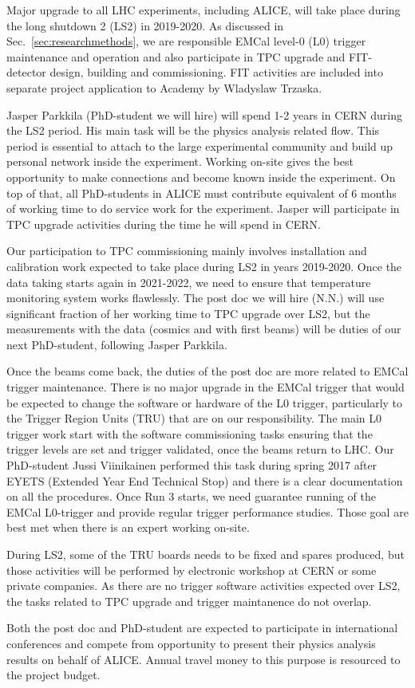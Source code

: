Major upgrade to all LHC experiments, including ALICE, will take place during the long shutdown 2 (LS2) in 2019-2020. As discussed in Sec.~\ref{sec:researchmethods}, we are responsible EMCal level-0 (L0) trigger maintenance and operation and also participate in TPC upgrade and FIT-detector design, building and commissioning. FIT activities are included into separate project application to Academy by Wladyslaw Trzaska. 

Jasper Parkkila (PhD-student we will hire) will spend 1-2 years in CERN during the LS2 period. His main task will be the physics analysis related flow. This period is essential to attach to the large experimental community and build up personal network inside the experiment. Working on-site gives the best opportunity to make connections and become known inside the experiment. On top of that, all PhD-students in ALICE must contribute equivalent of 6 months of working time to do service work for the experiment. Jasper will participate in TPC upgrade activities during the time he will spend in CERN.

Our participation to TPC commissioning mainly involves installation and calibration work expected to take place during LS2 in years 2019-2020. Once the data taking starts again in 2021-2022, we need to ensure that temperature monitoring system works flawlessly. The post doc we will hire (N.N.) will use significant fraction of her working time to TPC upgrade over LS2, but the measurements with the data (cosmics and with first beams) will be duties of our next PhD-student, following Jasper Parkkila.

Once the beams come back, the duties of the post doc are more related to EMCal trigger maintenance. There is no major upgrade in the EMCal trigger that would be expected to change the software or hardware of the L0 trigger, particularly to the Trigger Region Units (TRU) that are on our responsibility. The main L0 trigger work start with the software commissioning tasks ensuring that the trigger levels are set and trigger validated, once the beams return to LHC. Our PhD-student Jussi Viinikainen performed this task during spring 2017 after EYETS (Extended Year End Technical Stop) and there is a clear documentation on all the procedures. Once Run 3 starts, we need guarantee running of the EMCal L0-trigger and provide regular trigger performance studies. Those goal are best met when there is an expert working on-site.

During LS2, some of the TRU boards needs to be fixed and spares produced, but those activities will be performed by electronic workshop at CERN or some private companies. As there are no trigger software activities expected over LS2, the tasks related to TPC upgrade and trigger maintanence do not overlap.

Both the post doc and PhD-student are expected to participate in international conferences and compete from opportunity to present their physics analysis results on behalf of ALICE. Annual travel money to this purpose is resourced to the project budget.

\nopagebreak
